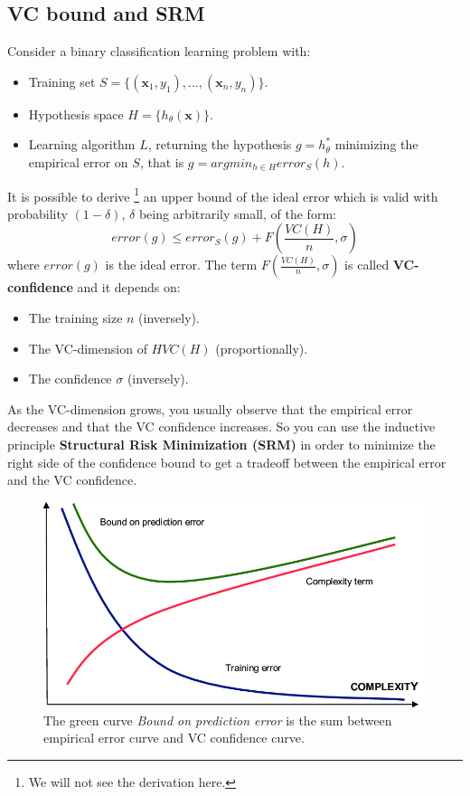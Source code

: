 \subsection{VC bound and SRM}
Consider a binary classification learning problem with:
\begin{itemize}
    \item Training set $S = \{(\textbf{x}_{1},y_{1}),...,(\textbf{x}_{n},y_{n})\}$.
    \item Hypothesis space $H = \{h_{\theta}(\textbf{x})\}$.
    \item Learning algorithm $L$, returning the hypothesis $g = h_{\theta}^{*}$ minimizing the empirical error on $S$, that is $g = argmin_{h \in H}error_{S}(h)$.
\end{itemize}
It is possible to derive \footnote{We will not see the derivation here.} an upper bound of the ideal error which is valid with probability $(1-\delta)$, $\delta$ being arbitrarily small, of the form:
\[error(g) \leq error_{S}(g) + F(\frac{VC(H)}{n},\sigma)\]
where $error(g)$ is the ideal error. The term $F(\frac{VC(H)}{n},\sigma)$ is called \textbf{VC-confidence} and it depends on:
\begin{itemize}
    \item The training size $n$ (inversely).
    \item The VC-dimension of $H VC(H)$ (proportionally).
    \item The confidence $\sigma$ (inversely).
\end{itemize}
As the VC-dimension grows, you usually observe that the empirical error decreases and that the VC confidence increases. So you can use the inductive principle \textbf{Structural Risk Minimization (SRM)} in order to minimize the right side of the confidence bound to get a tradeoff between the empirical error and the VC confidence.
\begin{figure}[h]
    \centering
    \includegraphics[scale=0.3]{images/Structural-risk-minimization-principle-Vapnik-1998.png}
    \caption{The green curve \textit{Bound on prediction error} is the sum between empirical error curve and VC confidence curve.}
\end{figure}
